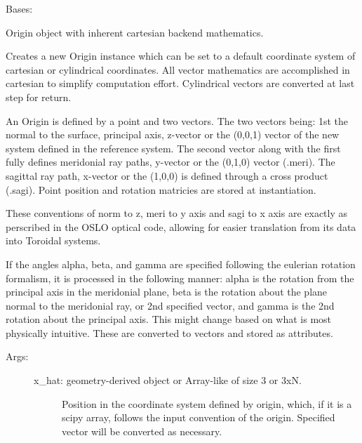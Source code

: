\documentclass[letterpaper,10pt,english]{sphinxmanual}
\begin{document}
\begin{fulllineitems}
\label{TRIPPy:TRIPPy.geometry.Origin}
Bases: {\hyperref[TRIPPy:TRIPPy.geometry.Point]{}}

Origin object with inherent cartesian backend mathematics.

Creates a new Origin instance which can be set to a default 
coordinate system of cartesian or cylindrical coordinates.
All vector mathematics are accomplished in cartesian to 
simplify computation effort. Cylindrical vectors are
converted at last step for return.

An Origin is defined by a point and two vectors. The two 
vectors being: 1st the normal to the surface, principal axis,
z-vector or the (0,0,1) vector of the new system defined in
the reference system. The second vector along with the 
first fully defines meridonial ray paths, y-vector or the
(0,1,0) vector (.meri). The sagittal ray path, x-vector or
the (1,0,0) is defined through a cross product (.sagi).
Point position and rotation matricies are stored at
instantiation.

These conventions of norm to z, meri to y axis and sagi to
x axis are exactly as perscribed in the OSLO optical code,
allowing for easier translation from its data into Toroidal
systems.

If the angles alpha, beta, and gamma are specified following
the eulerian rotation formalism, it is processed in the 
following manner: alpha is the rotation from the principal
axis in the meridonial plane, beta is the rotation about the
plane normal to the meridonial ray, or 2nd specified vector,
and gamma is the 2nd rotation about the principal axis. 
This might change based on what is most physically intuitive.
These are converted to vectors and stored as attributes.
\begin{description}
\item[{Args:}] \leavevmode\begin{description}
\item[{x\_hat: geometry-derived object or Array-like of size 3 or 3xN.}] \leavevmode
Position in the coordinate system defined by origin, 
which, if it is a scipy array, follows the input convention
of the origin. Specified vector will be converted as necessary.

\end{description}


\end{description}
\end{fulllineitems}
\end{document}
